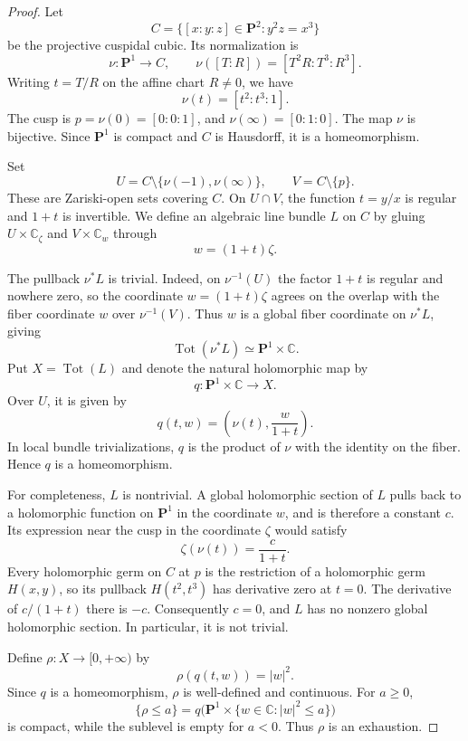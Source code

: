 \documentclass[11pt]{amsart}
\theoremstyle{definition}
\theoremstyle{remark}
\numberwithin{equation}{section}
\newcommand{\C}{\mathbb C}
\newcommand{\PP}{\mathbf P}
\newcommand{\Tot}{\operatorname{Tot}}
\begin{document}
\begin{proof}
Let
\[
 C=\{[x:y:z]\in\PP^2:y^2z=x^3\}
\]
be the projective cuspidal cubic. Its normalization is
\[
 \nu:\PP^1\longrightarrow C,\qquad
 \nu([T:R])=[T^2R:T^3:R^3].
\]
Writing $t=T/R$ on the affine chart $R\ne0$, we have
\[
 \nu(t)=[t^2:t^3:1].
\]
The cusp is $p=\nu(0)=[0:0:1]$, and
$\nu(\infty)=[0:1:0]$. The map $\nu$ is bijective.
Since $\PP^1$ is compact and $C$ is Hausdorff, it is a
homeomorphism.

Set
\[
 U=C\setminus\{\nu(-1),\nu(\infty)\},\qquad
 V=C\setminus\{p\}.
\]
These are Zariski-open sets covering $C$. On $U\cap V$, the
function $t=y/x$ is regular and $1+t$ is invertible.
We define an algebraic line bundle $L$ on $C$ by gluing
$U\times\C_\zeta$ and $V\times\C_w$ through
\begin{equation}\label{eq:cusp-bundle-gluing}
 w=(1+t)\zeta.
\end{equation}

The pullback $\nu^*L$ is trivial. Indeed, on $\nu^{-1}(U)$ the
factor $1+t$ is regular and nowhere zero, so the coordinate
$w=(1+t)\zeta$ agrees on the overlap with the fiber coordinate
$w$ over $\nu^{-1}(V)$. Thus $w$ is a global fiber coordinate
on $\nu^*L$, giving
\[
 \Tot(\nu^*L)\simeq\PP^1\times\C.
\]
Put $X=\Tot(L)$ and denote the natural holomorphic map by
\[
 q:\PP^1\times\C\longrightarrow X.
\]
Over $U$, it is given by
\[
 q(t,w)=\left(\nu(t),\frac{w}{1+t}\right).
\]
In local bundle trivializations, $q$ is the product of $\nu$
with the identity on the fiber. Hence $q$ is a homeomorphism.

For completeness, $L$ is nontrivial. A global holomorphic section
of $L$ pulls back to a holomorphic function on $\PP^1$ in the
coordinate $w$, and is therefore a constant $c$. Its expression
near the cusp in the coordinate $\zeta$ would satisfy
\[
 \zeta(\nu(t))=\frac{c}{1+t}.
\]
Every holomorphic germ on $C$ at $p$ is the restriction of a
holomorphic germ $H(x,y)$, so its pullback $H(t^2,t^3)$ has
derivative zero at $t=0$. The derivative of $c/(1+t)$ there is
$-c$. Consequently $c=0$, and $L$ has no nonzero global
holomorphic section. In particular, it is not trivial.

Define $\rho:X\to[0,+\infty)$ by
\begin{equation}\label{eq:cusp-exhaustion}
 \rho(q(t,w))=|w|^2.
\end{equation}
Since $q$ is a homeomorphism, $\rho$ is well-defined and
continuous. For $a\ge0$,
\[
 \{\rho\le a\}
 =
 q\bigl(\PP^1\times\{w\in\C:|w|^2\le a\}\bigr)
\]
is compact, while the sublevel is empty for $a<0$.
Thus $\rho$ is an exhaustion.


\end{proof}
\end{document}
